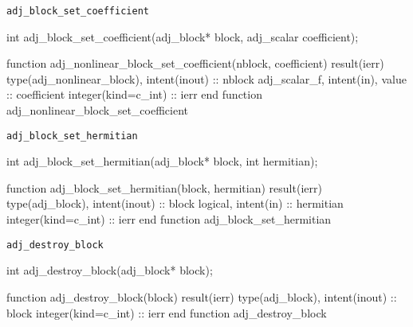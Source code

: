 \begin{boxwithtitle}{\texttt{adj_block_set_coefficient}}
\begin{minipage}{\columnwidth}
\begin{ccode}
  int adj_block_set_coefficient(adj_block* block, adj_scalar coefficient);
\end{ccode}
\begin{fortrancode}
  function adj_nonlinear_block_set_coefficient(nblock, coefficient) result(ierr)
    type(adj_nonlinear_block), intent(inout) :: nblock
    adj_scalar_f, intent(in), value :: coefficient
    integer(kind=c_int) :: ierr
  end function adj_nonlinear_block_set_coefficient
\end{fortrancode}
\end{minipage}
\end{boxwithtitle}


\begin{boxwithtitle}{\texttt{adj_block_set_hermitian}}
\begin{minipage}{\columnwidth}
\begin{ccode}
  int adj_block_set_hermitian(adj_block* block, int hermitian);
\end{ccode}
\begin{fortrancode}
  function adj_block_set_hermitian(block, hermitian) result(ierr)
    type(adj_block), intent(inout) :: block
    logical, intent(in) :: hermitian
    integer(kind=c_int) :: ierr
  end function adj_block_set_hermitian
\end{fortrancode}
\end{minipage}
\end{boxwithtitle}


\begin{boxwithtitle}{\texttt{adj_destroy_block}}
\begin{minipage}{\columnwidth}
\begin{ccode}
  int adj_destroy_block(adj_block* block);
\end{ccode}
\begin{fortrancode}
  function adj_destroy_block(block) result(ierr) 
    type(adj_block), intent(inout) :: block
    integer(kind=c_int) :: ierr
  end function adj_destroy_block
\end{fortrancode}
\end{minipage}
\end{boxwithtitle}


